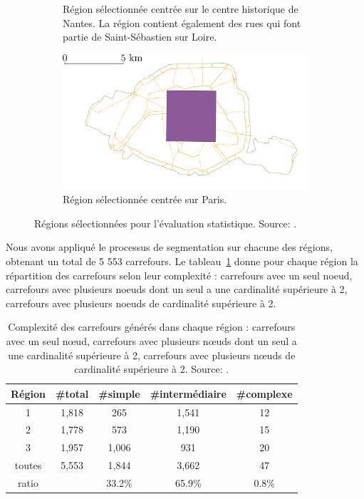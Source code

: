 \begin{figure}[ht]
\begin{subfigure}[t]{0.49\linewidth}
        \caption{Région sélectionnée centrée sur le centre historique de Nantes. La région contient également des rues qui font partie de Saint-Sébastien sur Loire.\label{fig:nantesRegion}}
    \end{subfigure}
    \begin{subfigure}[t]{0.49\linewidth}
        \includegraphics[width=\textwidth]{images/evaluation/crseg/paris.pdf}
        \caption{Région sélectionnée centrée sur Paris.\label{fig:parisRegion}}
    \end{subfigure}
    \caption{Régions sélectionnées pour l'évaluation statistique. Source: \cite{Favreau2022}.}
    \label{fig:regions}
\end{figure}

Nous avons appliqué le processus de segmentation sur chacune des régions, obtenant un total de 5 553 carrefours. Le tableau~\ref{tab:initRegions} donne pour chaque région la répartition des carrefours selon leur complexité : carrefours avec un seul noeud, carrefours avec plusieurs noeuds dont un seul a une cardinalité supérieure à 2, carrefours avec plusieurs noeuds de cardinalité supérieure à 2.

\newpar{}

\begin{table}[ht] 
    \centering
    \footnotesize
    \begin{tabular}{c|c|c|c|c}
    Région & \#total & \#simple &\#intermédiaire & \#complexe \\
    \hline
     1 & 1,818 & 265 & 1,541  & 12 \\
     2 & 1,778 & 573 & 1,190 & 15 \\
     3 & 1,957 & 1,006 & 931  & 20 \\
     \hline
     toutes & 5,553  & 1,844 & 3,662 &	47  \\
     \hline
     ratio & & 33.2\% & 65.9\% & 0.8\% \\
    \end{tabular}
    \caption{Complexité des carrefours générés dans chaque région : carrefours avec un seul nœud, carrefours avec plusieurs nœuds dont un seul a une cardinalité supérieure à 2, carrefours avec plusieurs nœuds de cardinalité supérieure à 2. Source: \cite{Favreau2022}.}
    \label{tab:initRegions}
\end{table}

